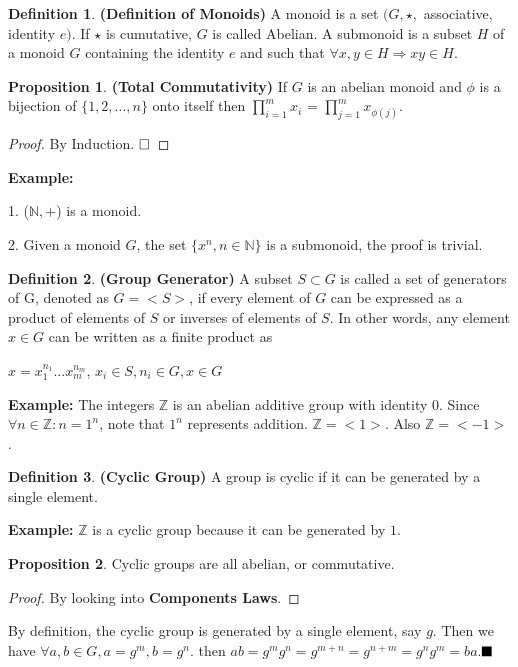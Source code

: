 \documentclass{article}
\theoremstyle{definition}
\newtheorem{defi}{Definition}[subsection]
\newtheorem{prop}{Proposition}[subsection]
\begin{document}
\begin{defi}
\textbf{(Definition of Monoids)} A monoid is a set $(G, \star,$ associative, identity $e)$. If $\star$ is cumutative, $G$ is called Abelian. A submonoid is a subset $H$ of a monoid $G$ containing the identity $e$ and such that $\forall x, y \in H \Rightarrow xy \in H $.
\end{defi}

\begin{prop}
\textbf{(Total Commutativity)} If $G$ is an abelian monoid and $\phi$ is a bijection of $\{1,2,...,n\}$ onto itself then $\prod^{m}_{i=1}x_i$ = $\prod^{m}_{j=1}x_{\phi(j)}$.
\begin{proof}
By Induction. $\hfill \square$
\end{proof}
\end{prop}

\noindent\textbf{Example:}

1. ($\mathbb{N},+$) is a monoid.

2. Given a monoid $G$, the set ${\{x^{n}, n \in \mathbb{N} \}}$ is a submonoid, the proof is trivial.
\begin{defi}
\noindent\textbf{(Group Generator)} A subset $S \subset G$ is called a set of generators of G, denoted as $G=<S>$, if every element of $G$ can be expressed as a product of elements of $S$ or inverses of elements of $S$. In other words, any element $x \in G$ can be written as a finite product as 

$x = x_{1}^{n_{1}}...x_{m}^{n_{m}}$, $x_{i} \in S, n_{i} \in G, x \in G$

\noindent\textbf{Example:} The integers $\mathbb{Z}$ is an abelian additive group with identity 0. Since $\forall n \in \mathbb{Z}: n=1^{n}$, note that $1^{n}$ represents addition. $\mathbb{Z}=<1>$. Also $\mathbb{Z}=<-1>$.
\end{defi}
\begin{defi}
\noindent\textbf{(Cyclic Group)} A group is cyclic if it can be generated by a single element.

\noindent\textbf{Example:} $\mathbb{Z}$ is a cyclic group because it can be generated by $1$.
\end{defi}
\begin{prop}
Cyclic groups are all abelian, or commutative.
\begin{proof}
By looking into \textbf{Components Laws}. 
\end{proof}
\end{prop}

By definition, the cyclic group is generated by a single element, say $g$. Then we have $\forall a, b \in G, a=g^{m}, b=g^{n}$. then $ab = g^{m}g^{n} = g^{m+n} = g^{n+m} = g^ng^m = ba$.$\hfill \blacksquare$
\end{document}
